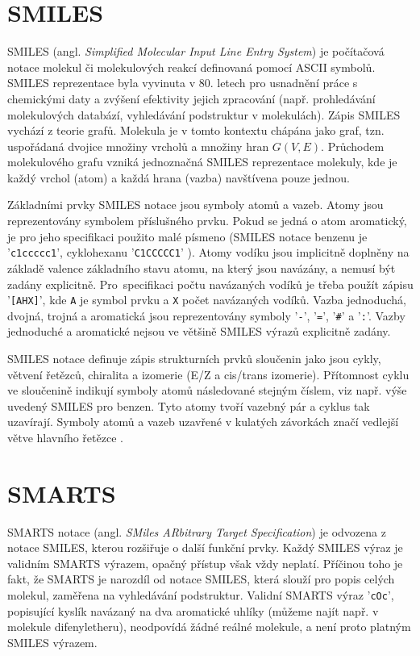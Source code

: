 \section{SMILES}
SMILES \cite{Weininger, Bunin, Leach_chemo} (angl. \textit{Simplified Molecular Input Line Entry System}) je počítačová notace molekul či molekulových reakcí definovaná pomocí ASCII symbolů. SMILES reprezentace byla vyvinuta v 80. letech pro usnadnění práce s chemickými daty  a zvýšení efektivity jejich zpracování (např. prohledávání molekulových databází, vyhledávání podstruktur v molekulách). Zápis SMILES vychází z teorie grafů. Molekula je v tomto kontextu chápána jako graf, tzn. uspořádaná dvojice množiny vrcholů a množiny hran $G(V,E)$. Průchodem molekulového grafu vzniká jednoznačná SMILES reprezentace molekuly, kde je každý vrchol (atom) a každá hrana (vazba) navštívena pouze jednou.

Základními prvky SMILES notace jsou symboly atomů a vazeb. Atomy jsou reprezentovány symbolem příslušného prvku. Pokud se jedná o atom aromatický, je pro jeho specifikaci použito malé písmeno (SMILES notace benzenu je '\verb|c1ccccc1|', cyklohexanu '\verb|C1CCCCC1|'
). Atomy vodíku jsou implicitně doplněny na základě valence základního stavu atomu, na který jsou navázány, a nemusí být  zadány explicitně. Pro~specifikaci počtu navázaných vodíků je třeba použít zápisu '\verb|[AHX]|', kde \verb|A| je symbol prvku a \verb|X| počet navázaných vodíků. Vazba jednoduchá, dvojná, trojná a aromatická jsou reprezentovány symboly '\verb|-|', '\verb|=|', '\verb|#|' a '\verb|:|'. Vazby jednoduché a aromatické nejsou ve většině SMILES výrazů explicitně zadány.

SMILES notace definuje zápis strukturních prvků sloučenin jako jsou cykly, větvení řetězců, chiralita a izomerie (E/Z a cis/trans izomerie). Přítomnost cyklu ve sloučenině indikují symboly atomů následované stejným číslem, viz např. výše uvedený SMILES pro benzen. Tyto atomy tvoří vazebný pár a cyklus tak uzavírají. Symboly atomů a vazeb uzavřené v kulatých závorkách značí vedlejší větve hlavního řetězce \cite{SMILES_exm}. 

\section{SMARTS}
SMARTS notace \cite{SMARTS_intro, SMARTS_exm} (angl. \textit{SMiles ARbitrary Target Specification}) je odvozena z notace SMILES, kterou rozšiřuje o další funkční prvky. Každý SMILES výraz je validním SMARTS výrazem, opačný přístup však vždy neplatí. Příčinou toho je fakt, že SMARTS je narozdíl od  notace SMILES, která slouží pro popis celých molekul, zaměřena na vyhledávání podstruktur. Validní SMARTS výraz '\verb|cOc|', popisující kyslík navázaný na dva aromatické uhlíky (můžeme najít např. v molekule difenyletheru), neodpovídá žádné reálné molekule, a není proto platným SMILES výrazem. 

